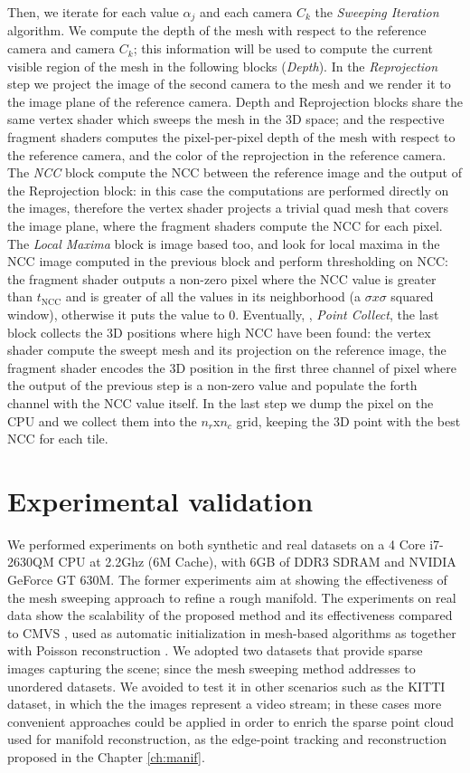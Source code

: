 Then, we iterate for each value $\alpha_j$ and each camera $C_k$ the \emph{Sweeping Iteration} algorithm. 
We compute the depth of the mesh with respect to the reference camera and camera $C_k$; this information will be used to compute the current visible region of the mesh in the following blocks (\emph{Depth}).
In the \emph{Reprojection} step we project the image of the second camera to the mesh and we render it to the image plane of the reference camera. 
Depth and  Reprojection blocks share the same vertex shader which sweeps the mesh in the 3D space; and the respective fragment shaders computes the pixel-per-pixel depth of the mesh with respect to the reference camera, and the color of the reprojection in the reference camera.
The \emph{NCC} block compute the NCC between the reference image and the output of the Reprojection block: in this case the computations are performed directly on the images, therefore the vertex shader projects a trivial quad mesh that covers the image plane, where the fragment shaders compute the NCC for each pixel.
The \emph{Local Maxima} block is image based too, and look for local maxima in the NCC image computed in the previous block and perform thresholding on NCC: the fragment shader outputs a non-zero pixel where the NCC value is greater than $t_{\text{NCC}}$ and is greater of all the values in its neighborhood (a $\sigma x \sigma$ squared window), otherwise it puts the value to $0$.
Eventually, \ie, \emph{Point Collect}, the last block collects the 3D positions where high NCC have been found: the vertex shader compute the sweept mesh and its projection on the reference image, the fragment shader encodes the 3D position in the first three channel of pixel where the output of the previous step is a non-zero value and populate the forth channel with the NCC value itself.
In the last step we dump the pixel on the CPU and we collect them into the $n_r$x$n_c$ grid, keeping the 3D point with the best NCC for each tile.



\section{Experimental validation}

We performed experiments on both synthetic and real datasets on a 4 Core i7-2630QM CPU at 2.2Ghz (6M Cache), with 6GB of DDR3 SDRAM and NVIDIA GeForce GT 630M. The former experiments aim at showing the effectiveness of the mesh sweeping approach to refine a rough manifold.
The experiments on real data show the scalability of the proposed method and its effectiveness compared to CMVS \cite{fu10}, used as automatic initialization in mesh-based algorithms as \cite{pan2015automatic,li2015detail} together with Poisson reconstruction \cite{kazhdan2006poisson}.
We adopted two datasets that provide sparse images capturing the scene; since the mesh sweeping method addresses to unordered datasets.
We avoided to test it in other scenarios such as the KITTI dataset, in which the the images represent a video stream; in these cases more convenient approaches could be applied in order to enrich the sparse point cloud used for manifold reconstruction, as the edge-point tracking and reconstruction proposed in the Chapter \ref{ch:manif}.

